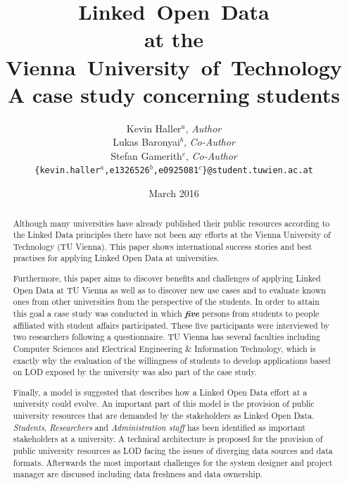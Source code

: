 \documentclass{article}
\begin{document}
\title{Linked~Open~Data\\
	   at the\\
	   Vienna~University~of~Technology\\
	   \large A case study concerning students}

\author{Kevin Haller$^a$, \textit{Author}\\
		Lukas Baronyai$^b$, \textit{Co-Author}\\
		Stefan Gamerith$^c$, \textit{Co-Author}\\
	\texttt{\{kevin.haller$^a$,e1326526$^b$,e0925081$^c$\}@student.tuwien.ac.at}}
\date{March 2016} 

\maketitle

\begin{abstract}
Although many universities have already published their public resources according to the Linked Data principles there have not been any efforts at the Vienna University of Technology (TU Vienna). This paper shows international success stories and best practises for applying Linked Open Data at universities. 

Furthermore, this paper aims to discover benefits and challenges of applying Linked Open Data at TU Vienna as well as to discover new use cases and to evaluate known ones from other universities from the perspective of the students. In order to attain this goal a case study was conducted in which \textit{\textbf{five}} persons from students to people affiliated with student affairs participated. These five participants were interviewed by two researchers following a questionnaire. TU Vienna has several faculties including Computer Sciences and Electrical Engineering \& Information Technology, which is exactly why the evaluation of the willingness of students to develop applications based on LOD exposed by the university was also part of the case study. 

Finally, a model is suggested that describes how a Linked Open Data effort at a university could evolve. An important part of this model is the provision of public university resources that are demanded by the stakeholders as Linked Open Data. \textit{Students}, \textit{Researchers} and \textit{Administration staff} has been identified as important stakeholders at a university. A technical architecture is proposed for the provision of public university resources as LOD facing the issues of diverging data sources and data formats. Afterwards the most important challenges for the system designer and project manager are discussed including data freshness and data ownership.


\end{abstract}
\end{document}
